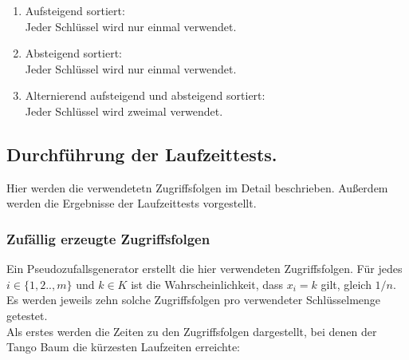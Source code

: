 \documentclass[a4paper,12pt]{article}
\begin{document}
\begin{enumerate}
  \item Aufsteigend sortiert:\\
  Jeder Schlüssel wird nur einmal verwendet.
  \item Absteigend sortiert:\\
  Jeder Schlüssel wird nur einmal verwendet.
  \item  Alternierend aufsteigend und absteigend sortiert:\\
   Jeder Schlüssel wird zweimal verwendet.
 \end{enumerate}



\subsection{Durchführung der Laufzeittests.} 
Hier werden die verwendetetn Zugriffsfolgen  im Detail beschrieben. Außerdem werden die Ergebnisse der Laufzeittests vorgestellt.
\subsubsection{Zufällig erzeugte Zugriffsfolgen}
	Ein Pseudozufallsgenerator erstellt die hier verwendeten Zugriffsfolgen. Für jedes $i \in \{1,2..,m\}$ und $k \in K$ ist die Wahrscheinlichkeit, dass $x_i = k$ gilt, gleich $1 /n$. Es werden jeweils zehn solche Zugriffsfolgen pro verwendeter Schlüsselmenge getestet. \label{zufZu} \\
	Als erstes werden die Zeiten zu den Zugriffsfolgen dargestellt, bei denen der Tango Baum die kürzesten Laufzeiten erreichte:
\end{document}
